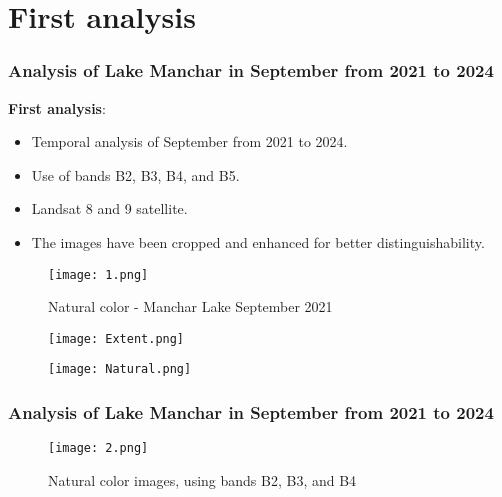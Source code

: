 \documentclass{beamer}
\begin{document}
\section{First analysis}

\begin{frame}
  \frametitle{\small Analysis of Lake Manchar in September from 2021 to 2024} 
  \small \textbf{First analysis}:
    \begin{itemize}
        \item \small Temporal analysis of September from 2021 to 2024.
        \item \small Use of bands B2, B3, B4, and B5.
        \item \small Landsat 8 and 9 satellite.
        \item \small The images have been cropped and enhanced for better distinguishability.
    \end{itemize}
 
\end{frame}

\begin{frame}
        \begin{figure}
        \centering
        \texttt{[image: 1.png]}
        \label{fig:enter-label}
        \caption{Natural color - Manchar Lake September 2021}
    \end{figure}

    \begin{figure}
        \centering
        \texttt{[image: Extent.png]}
        \label{fig:enter-label}
    \end{figure}

\begin{figure}
    \centering
    \texttt{[image: Natural.png]}
    \label{fig:enter-label}
\end{figure}
    
\end{frame}

\begin{frame}
  \frametitle{\small Analysis of Lake Manchar in September from 2021 to 2024} 
    \centering
    
    \begin{figure}
        \texttt{[image: 2.png]}
        \label{fig:enter-label}
        \caption{Natural color images, using bands B2, B3, and B4}
    \end{figure}
  
\end{frame}
\end{document}
